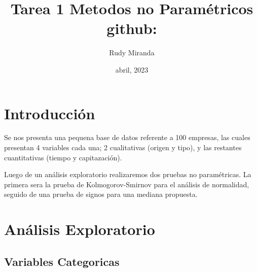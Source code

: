 \documentclass{article}
\title{Tarea 1 Metodos no Param\'etricos \\
github:}
\author{Rudy Miranda}
\date{abril, 2023}
\begin{document}
    \maketitle
    \tableofcontents

    \section{Introducci\'on}

    Se nos presenta una pequena base de datos referente a 100 empresas, las cuales presentan 4 variables cada una; 2 cualitativas (origen y tipo), y las restantes cuantitativas (tiempo y capitazaci\'on).

    Luego de un an\'alisis exploratorio realizaremos dos pruebas no param\'etricas. La primera sera la prueba de Kolmogorov-Smirnov para el an\'alisis de normalidad, seguido de una prueba de signos para una mediana propuesta.
    
    \section{An\'alisis Exploratorio}

    \subsection{Variables Categoricas}
    
\end{document}
